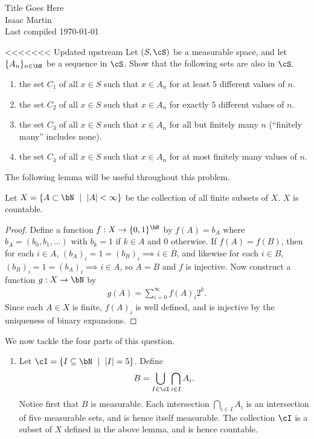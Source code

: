 \pagestyle{empty}
	\LARGE
\begin{center}
	Title Goes Here \\
	\Large
	Isaac Martin \\
    Last compiled \today
\end{center}
\normalsize
\vspace{-2mm}
\hru
{}
\begin{homework}[e]
<<<<<<< Updated upstream
	\prob Let $(S,\cS)$ be a measurable space, and let $\{A_n\}_{n\in \bN}$ be a sequence in $\cS$. Show that the following sets are also in $\cS.$
	\begin{enumerate}[(1)]
		\item the set $C_1$ of all $x \in S$ such that $x \in A_n$ for at least 5 different values of $n$.
		\item the set $C_2$ of all $x \in S$ such that $x \in A_n$ for exactly $5$ different values of $n$.
		\item the set $C_3$ of all $x \in S$ such that $x \in A_n$ for all but finitely many $n$ (``finitely many'' includes none).
		\item the set $C_4$ of all $x \in S$ such that $x \in A_n$ for at most finitely many values of $n$.
	\end{enumerate}
	\begin{prf}
		The following lemma will be useful throughout this problem.
		\begin{lem}\label{lem:finite-subsets-of-bN}
			Let $X = \{A \subset \bN ~\mid~ |A| < \infty\}$ be the collection of all finite subsets of $X$. $X$ is countable.
		\end{lem}
		\begin{proof}
			Define a function $f:X \to \{0,1\}^\bN$ by $f(A) = b_A$ where $b_A = (b_0,b_1,...)$ with $b_k = 1$ if $k \in A$ and $0$ otherwise. If $f(A) = f(B)$, then for each $i \in A$, $(b_A)_i = 1 = (b_B)_i \implies i \in B$, and likewise for each $i \in B$, $(b_B)_i = 1 = (b_A)_i \implies i \in A$, so $A = B$ and $f$ is injective.
			Now construct a function $g:X\to \bN$ by 
			\begin{align*}
				g(A) = \sum_{i = 0}^\infty f(A)_i 2^k.
			\end{align*}
			Since each $A \in X$ is finite, $f(A)_i$ is well defined, and is injective by the uniqueness of binary expansions.
		\end{proof}
		We now tackle the four parts of this question.
		\begin{enumerate}[(1)]
			\item Let $\cI = \{I \subseteq \bN ~\mid~ |I| = 5\}$. Define 
				\begin{align*}
					B = \bigcup_{I \in \cI} \bigcap_{i \in I} A_i.
				\end{align*}
				Notice first that $B$ is measurable. Each intersection $\bigcap_{i \in I} A_i$ is an intersection of five measurable sets, and is hence itself measurable. The collection $\cI$ is a subset of $X$ defined in the above lemma, and is hence countable.


\end{enumerate}
\end{prf}
\end{homework}
